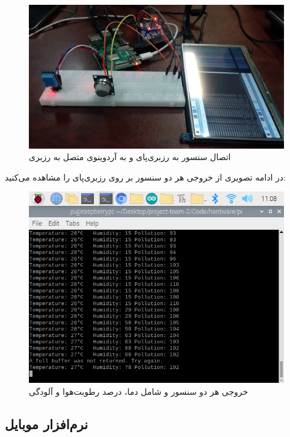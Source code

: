 \documentclass[12pt]{article}
\begin{document}
\begin{itemize}
	
		\begin{figure}[H]
		\begin{center}
			\includegraphics[width=.70\textwidth]{images/dhtmq2.jpg}
		\end{center}
		\caption{اتصال سنسور    به رزبری‌پای و  به آردوینوی متصل به رزبری}
	\end{figure}
	

	
	در ادامه تصویری از خروجی هر دو سنسور بر روی رزبری‌پای را مشاهده می‌کنید:
	
	
		
	\begin{figure}[H]
		\begin{center}
			\includegraphics[width=.70\textwidth]{images/envsensor.png}
		\end{center}
		\caption{خروجی هر دو سنسور  و  شامل دما، درصد رطوبت‌هوا و آلودگی}
	\end{figure}

	

	
	
	
\end{itemize}

\subsection{نرم‌افزار موبایل}
\end{document}
